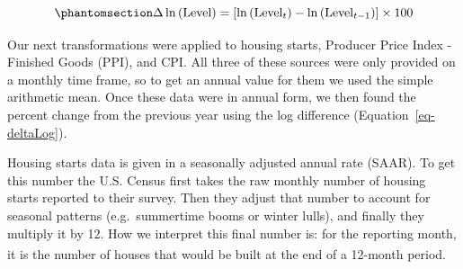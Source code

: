\documentclass[
  10pt,
  letterpaper,
  DIV=11,
  numbers=noendperiod]{scrartcl}
\begin{document}
\begin{equation}\phantomsection\label{eq-deltaLog}{
\Delta\ln{(\text{Level})} = 
[\ln{(\text{Level}_{t})} - \ln{(\text{Level}_{t-1})}] \times 100
}\end{equation}

Our next transformations were applied to housing starts, Producer Price
Index - Finished Goods (PPI), and CPI. All three of these sources were
only provided on a monthly time frame, so to get an annual value for
them we used the simple arithmetic mean. Once these data were in annual
form, we then found the percent change from the previous year using the
log difference (Equation~\ref{eq-deltaLog}).

Housing starts data is given in a seasonally adjusted annual rate
(SAAR). To get this number the U.S. Census first takes the raw monthly
number of housing starts reported to their survey. Then they adjust that
number to account for seasonal patterns (e.g.~summertime booms or winter
lulls), and finally they multiply it by 12. How we interpret this final
number is: for the reporting month, it is the number of houses that
would be built at the end of a 12-month
period.\textsuperscript{}
\end{document}
